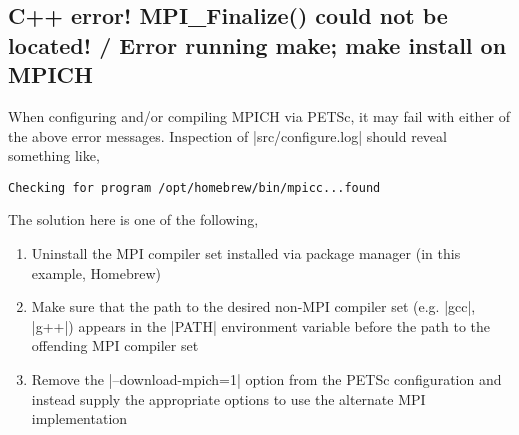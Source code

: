 \subsection*{C++ error! MPI\_Finalize() could not be located! / Error running make; make install on MPICH}%
When configuring and/or compiling MPICH via PETSc, it may fail with either of the above error messages. Inspection of \lstinlinebg|src/configure.log| should reveal something like,
\begin{lstlisting}
Checking for program /opt/homebrew/bin/mpicc...found
\end{lstlisting}
The solution here is one of the following,
\begin{enumerate}
\item Uninstall the MPI compiler set installed via package manager (in this example, Homebrew)
\item Make sure that the path to the desired non-MPI compiler set (e.g. \lstinlinebg|gcc|, \lstinlinebg|g++|) appears in the \lstinlinebg|PATH| environment variable before the path to the offending MPI compiler set
\item Remove the \lstinlinebg|--download-mpich=1| option from the PETSc configuration and instead supply the appropriate options to use the alternate MPI implementation
\end{enumerate}

\clearpage %

